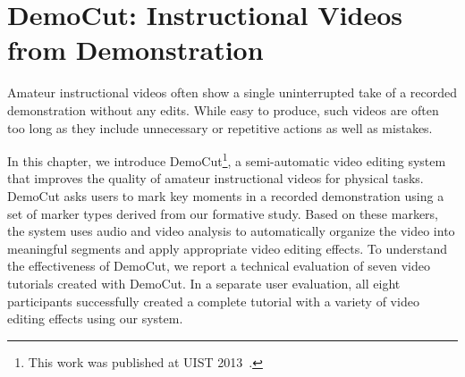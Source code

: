 \chapter{DemoCut: Instructional Videos from Demonstration}
\label{chapter_democut}

Amateur instructional videos often show a single uninterrupted take of a recorded demonstration without any edits. While easy to produce, such videos are often too long as they include unnecessary or repetitive actions as well as mistakes.

In this chapter, we introduce DemoCut\footnote{This work was published at UIST 2013~\cite{Chi:2013:DGC:2501988.2502052}.}, a semi-automatic video editing system that improves the quality of amateur instructional videos for physical
tasks. DemoCut asks users to mark key moments in a recorded demonstration using a set of marker types derived from our formative study.
%
Based on these markers, the system uses audio and video analysis to automatically
organize the video into meaningful segments and apply appropriate
video editing effects.
%
To understand the effectiveness of DemoCut, we report a technical evaluation of seven video tutorials created with DemoCut. In a separate user evaluation, all eight participants successfully created a complete tutorial with a variety of video editing effects using our system.


% 










